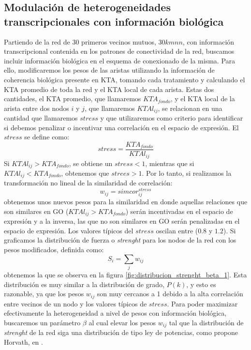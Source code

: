 \subsection{Modulación de heterogeneidades transcripcionales con información biológica}
Partiendo de la red de 30 primeros vecinos mutuos, $30kmnn$, con información transcripcional contenida en los patrones de conectividad de la red, buscamos incluir información biológica en el esquema de conexionado de la misma. Para ello, modificaremos los pesos de las aristas utilizando la información de coherencia biológica presente en KTA, tomando cada tratamiento y calculando el KTA promedio de toda la red y el KTA local de cada arista. Estas dos cantidades, el KTA promedio, que llamaremos $KTA_{fondo}$, y el KTA local de la arista entre dos nodos $i$ y $j$, que llamaremos $KTAl_{ij}$, se relacionan en una cantidad que llamaremos $stress$ y que utilizaremos como criterio para identificar si debemos penalizar o incentivar una correlación en el espacio de expresión. El $stress$ se define como:
\begin{equation}
	stress = \frac{KTA_{fondo}}{KTAl_{ij}}
	\label{eq:stress}
\end{equation}
Si $KTAl_{ij} > KTA_{fondo}$, se obtiene un $stress < 1$, mientras que si $KTAl_{ij} < KTA_{fondo}$, obtenemos que $strees > 1$. Por lo tanto, si realizamos la transformación no lineal de la similaridad de correlación:
\begin{equation}
	w_{ij} = simcor_{ij}^{stress}
	\label{eq:stress}
\end{equation}
obtenemos unos nuevos pesos para la similaridad en donde aquellas relaciones que son similares en GO ($KTAl_{ij} > KTA_{fondo}$) serán incentivadas en el espacio de expresión y a la inversa, las que no son similares en GO serán penalizadas en el espacio de expresión. Los valores típicos del $stress$ oscilan entre ($0.8$ y $1.2$). Si graficamos la distribución de fuerza o \textit{strenght} para los nodos de la red con los pesos modificados, definida como:
\begin{equation}
	S_i = \sum_j w_{ij}
	\label{eq:strength}
\end{equation}
obtenemos la que se observa en la figura \ref{fig:distribucion_strenght_beta_1}. Esta distribución es muy similar a la distribución de grado, $P(k)$, y esto es razonable, ya que los pesos $w_{ij}$ son muy cercanos a 1 debido a la alta correlación entre vecinos de un nodo y los valores típicos de $stress$. Para poder maximizar efectivamente la heterogeneidad a nivel de pesos con información biológica, buscaremos un parámetro $\beta$ al cual elevar los pesos $w_{ij}$ tal que la distribución de \textit{strenght} de la red siga una distribución de tipo ley de potencias, como propone Horvath, en \cite{Horvath2005}.\\
